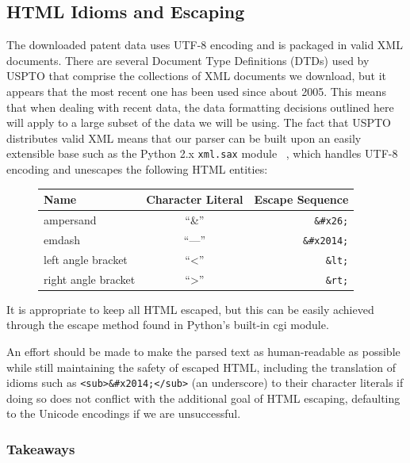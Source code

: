 \documentclass[11pt]{article}
\begin{document}
\subsection{HTML Idioms and Escaping}

The downloaded patent data uses UTF-8 encoding and is packaged in valid XML
documents. There are several Document Type Definitions (DTDs) used by USPTO
that comprise the collections of XML documents we download, but it appears that
the most recent one has been used since about 2005. This means that when
dealing with recent data, the data formatting decisions outlined here will
apply to a large subset of the data we will be using. The fact that USPTO
distributes valid XML means that our parser can be built upon an easily
extensible base such as the Python 2.x \verb`xml.sax` module ~\cite{xmlsax},
which handles UTF-8 encoding and unescapes the following HTML entities:

\begin{figure}[htb]
  \begin{center}
\begin{tabular}{|l|c|r|}
  \hline
  Name & Character Literal & Escape Sequence \\
  \hline
  ampersand & ``\&'' & \texttt{\&\#x26;} \\
  emdash & ``---'' & \texttt{\&\#x2014;} \\
  left angle bracket & ``\textless{}'' & \texttt{\&lt;} \\
  right angle bracket & ``\textgreater{}'' & \texttt{\&rt;} \\
  \hline
\end{tabular}
\end{center}
\end{figure}

It is appropriate to keep all HTML escaped, but this can be easily
achieved through the escape method found in Python's built-in cgi
module.

An effort should be made to make the parsed text as human-readable as
possible while still maintaining the safety of escaped HTML, including
the translation of idioms such as
\texttt{<sub>\&\#x2014;</sub>}
(an underscore) to their character literals if doing so does not
conflict with the additional goal of HTML escaping, defaulting to the
Unicode encodings if we are unsuccessful.

\subsubsection{Takeaways}
\end{document}
